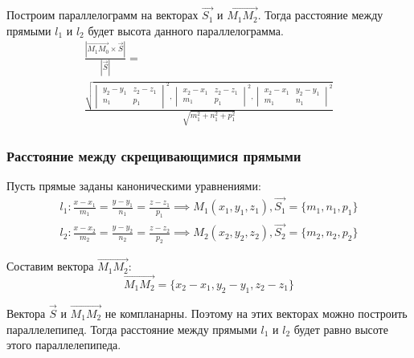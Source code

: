 Построим параллелограмм на векторах $\overrightarrow{S_1}$ и $\overrightarrow{M_1M_2}$.
Тогда расстояние между прямыми $l_1$ и $l_2$ будет высота данного параллелограмма.
\begin{gather*}
  \frac{|\overrightarrow{M_1M_0} \times \vec{S}|}{|\vec{S}|} = \\
  \frac{\sqrt{
  \begin{vmatrix}
    y_2 - y_1 & z_2 - z_1 \\
    n_1 & p_1
  \end{vmatrix}^2,
  \begin{vmatrix}
    x_2 - x_1 & z_2 - z_1 \\
    m_1 & p_1
  \end{vmatrix}^2, 
  \begin{vmatrix}
    x_2 - x_1 & y_2 - y_1 \\
    m_1 & n_1
  \end{vmatrix}^2
  }}{\sqrt{m_1^2 + n_1^2 + p_1^2} } 
\end{gather*}

\subsubsection{Расстояние между скрещивающимися прямыми}

Пусть прямые заданы каноническими уравнениями:
\begin{gather*}
  l_1: \frac{x - x_1}{m_1} = \frac{y - y_1}{n_1} = \frac{z - z_1}{p_1} \implies M_1(x_1, y_1, z_1), \vec{S_1} = \{m_1, n_1, p_1\} \\
  l_2: \frac{x - x_2}{m_2} = \frac{y - y_2}{n_2} = \frac{z - z_2}{p_2} \implies M_2(x_2, y_2, z_2), \vec{S_2} = \{m_2, n_2, p_2\}
\end{gather*}

Составим вектора $\overrightarrow{M_1M_2}$: \[
\overrightarrow{M_1M_2} = \{x_2 - x_1, y_2 - y_1, z_2 - z_1\} 
\] 

Вектора $\vec{S}$ и $\overrightarrow{M_1M_2}$ не компланарны. 
Поэтому на этих векторах можно построить параллелепипед.
Тогда расстояние между прямыми $l_1$ и $l_2$ будет равно высоте этого параллелепипеда.

